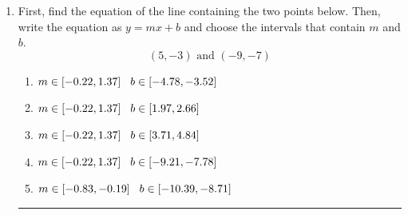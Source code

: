 \documentclass[14pt]{extbook}
\newcommand{\litem}[1]{\item#1\hspace*{-1cm}\rule{\textwidth}{0.4pt}}
\begin{document}
\begin{enumerate}
{\begin{enumerate}[label=\Alph*.]
\end{enumerate} }
\litem{
First, find the equation of the line containing the two points below. Then, write the equation as $ y=mx+b $ and choose the intervals that contain $m$ and $b$.\[ (5, -3) \text{ and } (-9, -7) \]\begin{enumerate}[label=\Alph*.]
\item \( m \in [-0.22, 1.37] \hspace*{3mm} b \in [-4.78, -3.52] \)
\item \( m \in [-0.22, 1.37] \hspace*{3mm} b \in [1.97, 2.66] \)
\item \( m \in [-0.22, 1.37] \hspace*{3mm} b \in [3.71, 4.84] \)
\item \( m \in [-0.22, 1.37] \hspace*{3mm} b \in [-9.21, -7.78] \)
\item \( m \in [-0.83, -0.19] \hspace*{3mm} b \in [-10.39, -8.71] \)

\end{enumerate} }
\end{enumerate}
\end{document}
